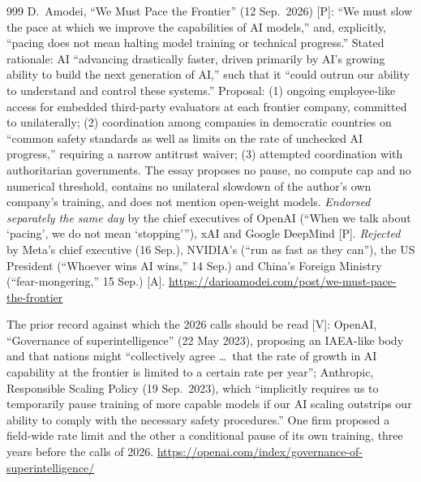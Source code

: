 \begin{thebibliography}{999}
 D.~Amodei, ``We Must Pace the Frontier'' (12 Sep.\ 2026) [P]: ``We must slow the pace at which we improve the capabilities of AI models,'' and, explicitly, ``pacing does not mean halting model training or technical progress.'' Stated rationale: AI ``advancing drastically faster, driven primarily by AI's growing ability to build the next generation of AI,'' such that it ``could outrun our ability to understand and control these systems.'' Proposal: (1) ongoing employee-like access for embedded third-party evaluators at each frontier company, committed to unilaterally; (2) coordination among companies in democratic countries on ``common safety standards as well as limits on the rate of unchecked AI progress,'' requiring a narrow antitrust waiver; (3) attempted coordination with authoritarian governments. The essay proposes no pause, no compute cap and no numerical threshold, contains no unilateral slowdown of the author's own company's training, and does not mention open-weight models. \emph{Endorsed separately the same day} by the chief executives of OpenAI (``When we talk about `pacing', we do not mean `stopping'''), xAI and Google DeepMind [P]. \emph{Rejected} by Meta's chief executive (16 Sep.), NVIDIA's (``run as fast as they can''), the US President (``Whoever wins AI wins,'' 14 Sep.) and China's Foreign Ministry (``fear-mongering,'' 15 Sep.) [A]. \url{https://darioamodei.com/post/we-must-pace-the-frontier}

 The prior record against which the 2026 calls should be read [V]: OpenAI, ``Governance of superintelligence'' (22 May 2023), proposing an IAEA-like body and that nations might ``collectively agree \ldots\ that the rate of growth in AI capability at the frontier is limited to a certain rate per year''; Anthropic, Responsible Scaling Policy (19 Sep.\ 2023), which ``implicitly requires us to temporarily pause training of more capable models if our AI scaling outstrips our ability to comply with the necessary safety procedures.'' One firm proposed a field-wide rate limit and the other a conditional pause of its own training, three years before the calls of 2026. \url{https://openai.com/index/governance-of-superintelligence/}


\end{thebibliography}
